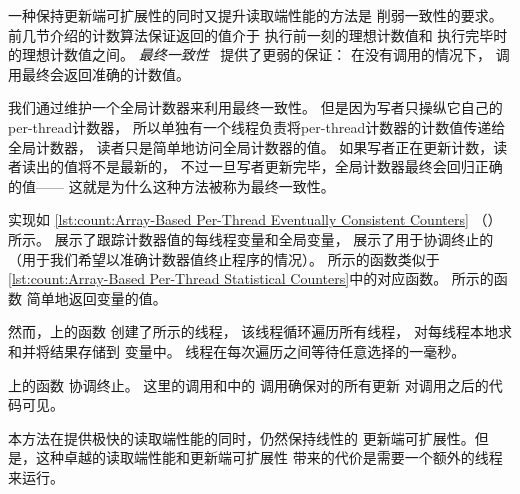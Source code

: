一种保持更新端可扩展性的同时又提升读取端性能的方法是
削弱一致性的要求。
前几节介绍的计数算法保证返回的值介于
执行前一刻的理想计数值和
执行完毕时的理想计数值之间。
\emph{最终一致性}~\cite{WernerVogels:2009:EventuallyConsistent}
提供了更弱的保证：
在没有调用的情况下，
调用最终会返回准确的计数值。

我们通过维护一个全局计数器来利用最终一致性。
但是因为写者只操纵它自己的per-thread计数器，
所以单独有一个线程负责将per-thread计数器的计数值传递给全局计数器，
读者只是简单地访问全局计数器的值。
如果写者正在更新计数，读者读出的值将不是最新的，
不过一旦写者更新完毕，全局计数器最终会回归正确的值——
这就是为什么这种方法被称为最终一致性。

\begin{listing}
\caption{基于数组的Per-Thread最终一致性Counters}
\label{lst:count:Array-Based Per-Thread Eventually Consistent Counters}
\end{listing}

\begin{fcvref}
实现如
\cref{lst:count:Array-Based Per-Thread Eventually Consistent Counters}
（）所示。
展示了跟踪计数器值的每线程变量和全局变量，
展示了用于协调终止的
（用于我们希望以准确计数器值终止程序的情况）。
所示的函数类似于
\cref{lst:count:Array-Based Per-Thread Statistical Counters}中的对应函数。
所示的函数
简单地返回变量的值。

然而，上的函数
创建了所示的线程，
该线程循环遍历所有线程，
对每线程本地求和并将结果存储到
变量中。
线程在每次遍历之间等待任意选择的一毫秒。

\QuickQuizEnd

上的函数
协调终止。
这里的调用和中的
调用确保对的所有更新
对调用之后的代码可见。

本方法在提供极快的读取端性能的同时，仍然保持线性的
更新端可扩展性。但是，这种卓越的读取端性能和更新端可扩展性
带来的代价是需要一个额外的线程来运行。
\end{fcvref}

